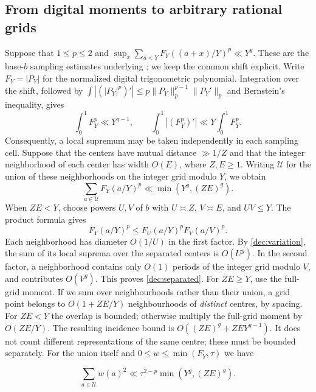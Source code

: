 \documentclass[11pt,a4paper]{article}
\theoremstyle{paperplain}
\numberwithin{equation}{section}
\begin{document}
\subsection{From digital moments to arbitrary rational grids}
\label{dec:grids}

Suppose that $1\le p\le2$ and
$\sup_x\sum_{a<Y}F_Y((a+x)/Y)^p\ll Y^g$.
These are the base-$b$ sampling estimates underlying
\cite[Lemmas 10.5--10.7]{Maynard2019}; we keep the common shift explicit.
Write $F_Y=|P_Y|$ for the normalized digital trigonometric polynomial.
Integration over the shift, followed by
$\int|(|P_Y|^p)'|\le p\|P_Y\|_p^{p-1}\|P_Y'\|_p$
and Bernstein's inequality, gives
\begin{equation}\label{dec:variation}
 \int_0^1F_Y^p\ll Y^{g-1},\qquad
 \int_0^1|(F_Y^p)'|\ll Y\int_0^1F_Y^p.
\end{equation}
Consequently, a local supremum may be taken independently in each sampling
cell. Suppose that the centers have mutual distance $\gg1/Z$ and that
the integer neighborhood of each center has width $O(E)$, where $Z,E\ge1$.
Writing $\mathcal U$ for the union of these neighborhoods on the integer
grid modulo $Y$, we obtain
\begin{equation}\label{dec:separated}
 \sum_{a\in\mathcal U}F_Y(a/Y)^p\ll\min(Y^g,(ZE)^g).
\end{equation}
When $ZE<Y$, choose powers $U,V$ of $b$ with
$U\asymp Z$, $V\asymp E$, and $UV\le Y$. The product formula gives
\[
 F_Y(a/Y)^p\le F_U(a/Y)^p F_V(a/V)^p.
\]
Each neighborhood has diameter $O(1/U)$ in the first factor.
By \eqref{dec:variation}, the sum of its local suprema over the
separated centers is $O(U^g)$. In the second factor, a neighborhood
contains only $O(1)$ periods of the integer grid modulo $V$,
and contributes $O(V^g)$. This proves \eqref{dec:separated}.
For $ZE\ge Y$, use the full-grid moment.
If we sum over neighbourhoods rather than their union, a grid point
belongs to $O(1+ZE/Y)$ neighbourhoods of \emph{distinct} centres, by
spacing. For $ZE<Y$ the overlap is bounded; otherwise multiply the
full-grid moment by $O(ZE/Y)$. The resulting incidence bound is
$O((ZE)^g+ZEY^{g-1})$. It does not count different representations
of the same centre; these must be bounded separately. For the union
itself and $0\le w\le\min(F_Y,\tau)$ we have

\begin{equation}\label{dec:squarearc}
 \sum_{a\in\mathcal U}w(a)^2
 \ll\tau^{2-p}\min(Y^g,(ZE)^g).
\end{equation}
\end{document}
